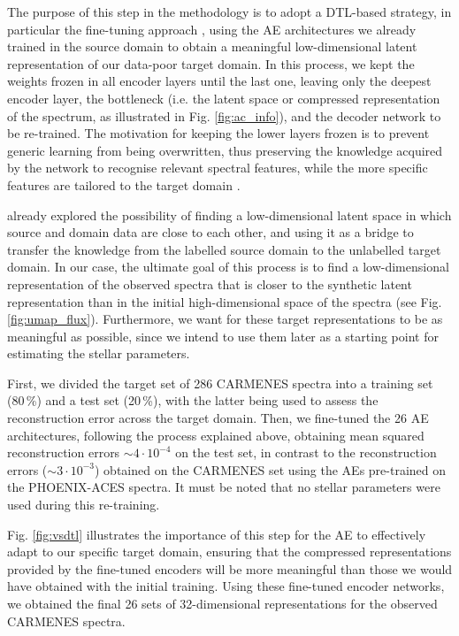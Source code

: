 The purpose of this step in the methodology is to adopt a DTL-based strategy, in particular the fine-tuning approach \citep{brian2016,yosinski2014}, using the AE architectures we already trained in the source domain to obtain a meaningful low-dimensional latent representation of our data-poor target domain. In this process, we kept the weights frozen in all encoder layers until the last one, leaving only the deepest encoder layer, the bottleneck (i.e. the latent space or compressed representation of the spectrum, as illustrated in Fig. \ref{fig:ac_info}), and the decoder network to be re-trained. The motivation for keeping the lower layers frozen is to prevent generic learning from being overwritten, thus preserving the knowledge acquired by the network to recognise relevant spectral features, while the more specific features are tailored to the target domain \citep{sadr2020}.

\citet{pan2018} already explored the possibility of finding a low-dimensional latent space in which source and domain data are close to each other, and using it as a bridge to transfer the knowledge from the labelled source domain to the unlabelled target domain. In our case, the ultimate goal of this process is to find a low-dimensional representation of the observed spectra that is closer to the synthetic latent representation than in the initial high-dimensional space of the spectra (see Fig. \ref{fig:umap_flux}). Furthermore, we want for these target representations to be as meaningful as possible, since we intend to use them later as a starting point for estimating the stellar parameters.

First, we divided the target set of 286 CARMENES spectra into a training set (80\,\%) and a test set (20\,\%), with the latter being used to assess the reconstruction error across the target domain. Then, we fine-tuned the 26 AE architectures, following the process explained above, obtaining mean squared reconstruction errors $\sim4\cdot 10^{-4}$ on the test set, in contrast to the reconstruction errors ($\sim3\cdot 10^{-3}$) obtained on the CARMENES set using the AEs pre-trained on the PHOENIX-ACES spectra. It must be noted that no stellar parameters were used during this re-training.

Fig. \ref{fig:vsdtl} illustrates the importance of this step for the AE to effectively adapt to our specific target domain, ensuring that the compressed representations provided by the fine-tuned encoders will be more meaningful than those we would have obtained with the initial training. Using these fine-tuned encoder networks, we obtained the final 26 sets of 32-dimensional representations for the observed CARMENES spectra.


